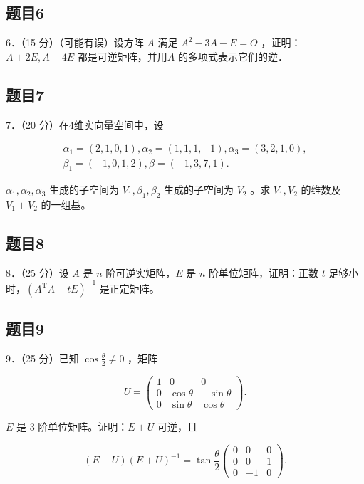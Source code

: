 \documentclass{article}
\begin{document}
\subsection{题目6}
6．（15 分）（可能有误）设方阵 \(A\) 满足 \(A^{2}-3 A-E=O\) ，证明：\(A+2 E, A-4 E\) 都是可逆矩阵，并用\(A\) 的多项式表示它们的逆．

\subsection{题目7}
7．（20 分）在4维实向量空间中，设

\[
\begin{gathered}
\alpha_{1}=(2,1,0,1), \alpha_{2}=(1,1,1,-1), \alpha_{3}=(3,2,1,0), \\
\beta_{1}=(-1,0,1,2), \beta=(-1,3,7,1) .
\end{gathered}
\]

\(\alpha_{1}, \alpha_{2}, \alpha_{3}\) 生成的子空间为 \(V_{1}, \beta_{1}, \beta_{2}\) 生成的子空间为 \(V_{2}\) 。求 \(V_{1}, V_{2}\) 的维数及 \(V_{1}+V_{2}\) 的一组基。

\subsection{题目8}
8．（25 分）设 \(A\) 是 \(n\) 阶可逆实矩阵，\(E\) 是 \(n\) 阶单位矩阵，证明：正数 \(t\) 足够小时，\(\left(A^{\mathrm{T}} A-t E\right)^{-1}\) 是正定矩阵。

\subsection{题目9}
9．（25 分）已知 \(\cos \frac{\theta}{2} \neq 0\) ，矩阵

\[
U=\left(\begin{array}{ccc}
1 & 0 & 0 \\
0 & \cos \theta & -\sin \theta \\
0 & \sin \theta & \cos \theta
\end{array}\right) .
\]

\(E\) 是 3 阶单位矩阵。证明：\(E+U\) 可逆，且

\[
(E-U)(E+U)^{-1}=\tan \frac{\theta}{2}\left(\begin{array}{ccc}
0 & 0 & 0 \\
0 & 0 & 1 \\
0 & -1 & 0
\end{array}\right) .
\]
\end{document}
